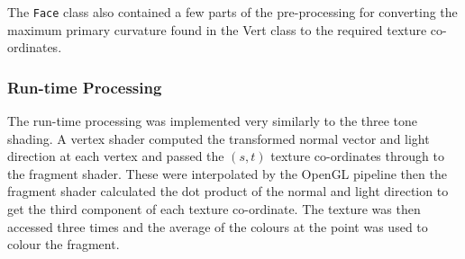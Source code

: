       The \texttt{Face} class also contained a few parts of the pre-processing
      for converting the maximum primary curvature found in the Vert class to
      the required texture co-ordinates.


    \subsubsection{Run-time Processing}

      The run-time processing was implemented very similarly to the three tone
      shading.  A vertex shader computed the transformed normal vector and light
      direction at each vertex and passed the $\left(s, t\right)$ texture
      co-ordinates through to the fragment shader.  These were interpolated by
      the OpenGL pipeline then the fragment shader calculated the dot product of
      the normal and light direction to get the third component of each texture
      co-ordinate.  The texture was then accessed three times and the average of
      the colours at the point was used to colour the fragment.
